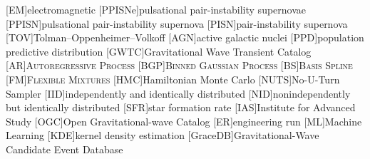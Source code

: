 
[EM]{electromagnetic}
[PPISNe]{pulsational pair-instability supernovae}
[PPISN]{pulsational pair-instability supernova}
[PISN]{pair-instability supernova}
[TOV]{Tolman--Oppenheimer--Volkoff}
[AGN]{active galactic nuclei}
[PPD]{population predictive distribution}
[GWTC]{Gravitational Wave Transient Catalog}
[AR]{\textsc{Autoregressive Process}}
[BGP]{\textsc{Binned Gaussian Process}}
[BS]{\textsc{Basis Spline}}
[FM]{\textsc{Flexible Mixtures}}
[HMC]{Hamiltonian Monte Carlo}
[NUTS]{No-U-Turn Sampler}
[IID]{independently and identically distributed}
[NID]{nonindependently but identically distributed}
[SFR]{star formation rate}
[IAS]{Institute for Advanced Study}
[OGC]{Open Gravitational-wave Catalog}
[ER]{engineering run}
[ML]{Machine Learning}
[KDE]{kernel density estimation}
[GraceDB]{Gravitational-Wave Candidate Event Database}

\newcommand{\GWPOPULATION}{\textsc{GWPopulation}\xspace}


\newcommand{\JAX}{\textsc{Jax}\xspace}
\newcommand{\NUMPYRO}{\textsc{NumPyro}\xspace}

